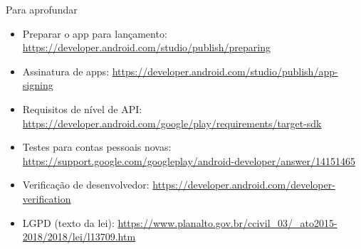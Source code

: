 \documentclass[aspectratio=169,10pt]{beamer}
\begin{document}
\begin{frame}{Para aprofundar}
  \small
  \begin{itemize}
    \item Preparar o app para lançamento: \url{https://developer.android.com/studio/publish/preparing}
    \item Assinatura de apps: \url{https://developer.android.com/studio/publish/app-signing}
    \item Requisitos de nível de API: \url{https://developer.android.com/google/play/requirements/target-sdk}
    \item Testes para contas pessoais novas: \url{https://support.google.com/googleplay/android-developer/answer/14151465}
    \item Verificação de desenvolvedor: \url{https://developer.android.com/developer-verification}
    \item LGPD (texto da lei): \url{https://www.planalto.gov.br/ccivil_03/_ato2015-2018/2018/lei/l13709.htm}
  \end{itemize}
\end{frame}

\end{document}
